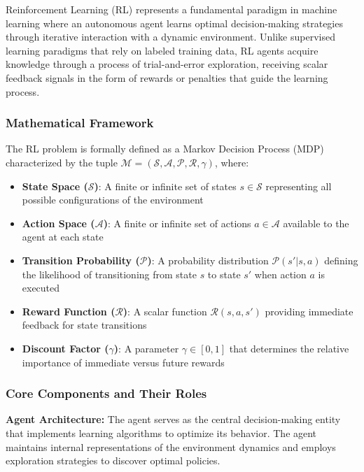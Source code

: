 \documentclass[12pt]{article}
\begin{document}
{{{Reinforcement Learning (RL) represents a fundamental paradigm in machine learning where an autonomous agent learns optimal decision-making strategies through iterative interaction with a dynamic environment. Unlike supervised learning paradigms that rely on labeled training data, RL agents acquire knowledge through a process of trial-and-error exploration, receiving scalar feedback signals in the form of rewards or penalties that guide the learning process.

\subsubsection{Mathematical Framework}

The RL problem is formally defined as a Markov Decision Process (MDP) characterized by the tuple $\mathcal{M} = (\mathcal{S}, \mathcal{A}, \mathcal{P}, \mathcal{R}, \gamma)$, where:

\begin{itemize}
    \item \textbf{State Space ($\mathcal{S}$)}: A finite or infinite set of states $s \in \mathcal{S}$ representing all possible configurations of the environment
    \item \textbf{Action Space ($\mathcal{A}$)}: A finite or infinite set of actions $a \in \mathcal{A}$ available to the agent at each state
    \item \textbf{Transition Probability ($\mathcal{P}$)}: A probability distribution $\mathcal{P}(s'|s,a)$ defining the likelihood of transitioning from state $s$ to state $s'$ when action $a$ is executed
    \item \textbf{Reward Function ($\mathcal{R}$)}: A scalar function $\mathcal{R}(s,a,s')$ providing immediate feedback for state transitions
    \item \textbf{Discount Factor ($\gamma$)}: A parameter $\gamma \in [0,1]$ that determines the relative importance of immediate versus future rewards
\end{itemize}

\subsubsection{Core Components and Their Roles}

\textbf{Agent Architecture:}
The agent serves as the central decision-making entity that implements learning algorithms to optimize its behavior. The agent maintains internal representations of the environment dynamics and employs exploration strategies to discover optimal policies.

}}}
\end{document}
